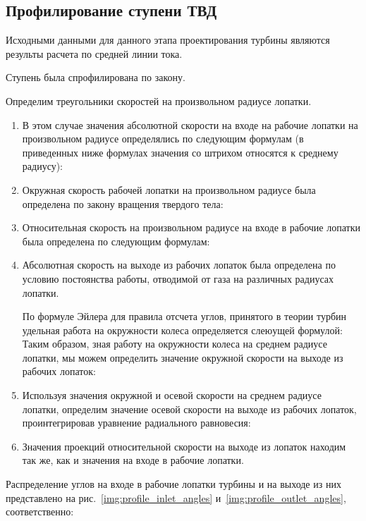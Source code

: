 \subsection{Профилирование ступени ТВД}
Исходными данными для данного этапа проектирования турбины являются результы расчета по средней линии тока.

Ступень была спрофилирована по закону.

Определим треугольники скоростей на произвольном радиусе лопатки.

\begin{enumerate}

	\item В этом случае значения абсолютной скорости на входе на рабочие лопатки на произвольном радиусе определялись по следующим формулам (в приведенных ниже формулах значения со штрихом относятся к среднему радиусу):
	\item Окружная скорость рабочей лопатки на произвольном радиусе была определена по закону вращения твердого тела:
	\item Относительная скорость на произвольном радиусе на входе в рабочие лопатки была определена по следующим формулам:
	\item Абсолютная скорость на выходе из рабочих лопаток была определена по условию постоянства работы, отводимой от газа на различных радиусах лопатки.

	По формуле Эйлера для правила отсчета углов, принятого в теории турбин удельная работа на окружности колеса определяется слеюущей формулой:
	Таким образом, зная работу на окружности колеса на среднем радиусе лопатки, мы можем определить значение окружной скорости на выходе из рабочих лопаток:
	\item Используя значения окружной и осевой скорости на среднем радиусе лопатки, определим значение осевой скорости на выходе из рабочих лопаток, проинтегрировав уравнение радиального равновесия:
	\item Значения проекций относительной скорости на выходе из лопаток находим так же, как и значения на входе в рабочие лопатки.

\end{enumerate}
Распределение углов на входе в рабочие лопатки турбины и на выходе из них представлено на рис.~\ref{img:profile_inlet_angles}
и~\ref{img:profile_outlet_angles}, соответственно:
	